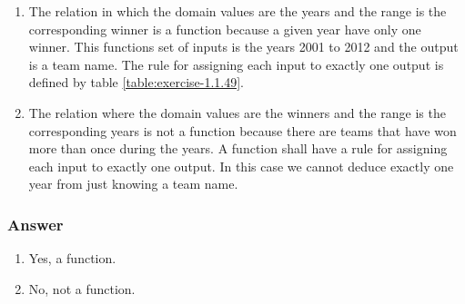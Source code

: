 \begin{enumerate}[label = (\alph*)]
  \item
    The relation in which the domain values are the years and the range is the corresponding winner is a function because a given year have only one winner. This functions set of inputs is the years 2001 to 2012 and the output is a team name. The rule for assigning each input to exactly one output is defined by table \ref{table:exercise-1.1.49}.
  \item
    The relation where the domain values are the winners and the range is the corresponding years is not a function because there are teams that have won more than once during the years. A function shall have a rule for assigning each input to exactly one output. In this case we cannot deduce exactly one year from just knowing a team name.
\end{enumerate}

\subsubsection*{Answer}

\begin{enumerate}[label = (\alph*)]
  \item
    Yes, a function.
  \item
    No, not a function.
\end{enumerate}
